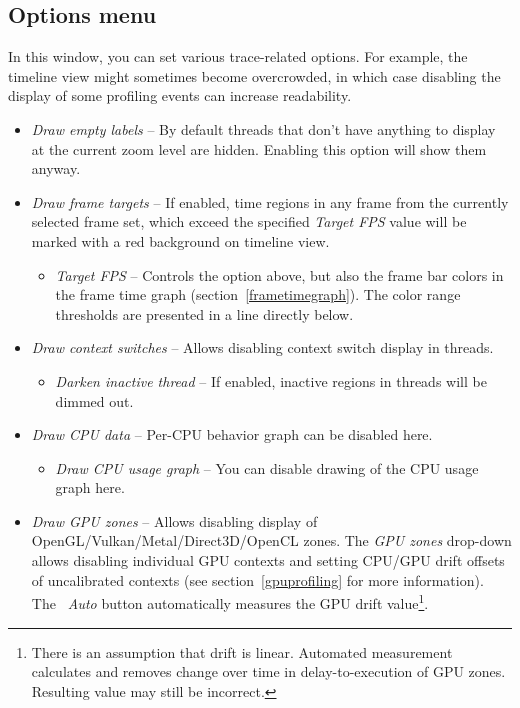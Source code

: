 \documentclass[hidelinks,titlepage,a4paper,twoside]{article}
\begin{document}
\subsection{Options menu}
\label{options}

In this window, you can set various trace-related options. For example, the timeline view might sometimes become overcrowded, in which case disabling the display of some profiling events can increase readability.

\begin{itemize}
\item \emph{\faExpand{} Draw empty labels} -- By default threads that don't have anything to display at the current zoom level are hidden. Enabling this option will show them anyway.
\item \emph{\faFlagCheckered{} Draw frame targets} -- If enabled, time regions in any frame from the currently selected frame set, which exceed the specified \emph{Target FPS} value will be marked with a red background on timeline view.
\begin{itemize}
\item \emph{Target FPS} -- Controls the option above, but also the frame bar colors in the frame time graph (section~\ref{frametimegraph}). The color range thresholds are presented in a line directly below.
\end{itemize}
\item \emph{\faHiking{} Draw context switches} -- Allows disabling context switch display in threads.
\begin{itemize}
\item \emph{\faMoon{} Darken inactive thread} -- If enabled, inactive regions in threads will be dimmed out.
\end{itemize}
\item \emph{\faSlidersH{} Draw CPU data} -- Per-CPU behavior graph can be disabled here.
\begin{itemize}
\item \emph{\faSignature{} Draw CPU usage graph} -- You can disable drawing of the CPU usage graph here.
\end{itemize}
\item \emph{\faEye{} Draw GPU zones} -- Allows disabling display of OpenGL/Vulkan/Metal/Direct3D/OpenCL zones. The \emph{GPU zones} drop-down allows disabling individual GPU contexts and setting CPU/GPU drift offsets of uncalibrated contexts (see section~\ref{gpuprofiling} for more information). The \emph{\faRobot~Auto} button automatically measures the GPU drift value\footnote{There is an assumption that drift is linear. Automated measurement calculates and removes change over time in delay-to-execution of GPU zones. Resulting value may still be incorrect.}.

\end{itemize}
\end{document}
